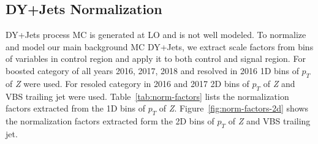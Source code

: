 \subsection{
  DY+Jets Normalization
}

DY+Jets process \gls{MC} is generated at \gls{LO} and is not well modeled.
To normalize and model our main background \gls{MC} DY+Jets,
we extract scale factors from bins of variables
in control region and apply it to both control and signal region.
For boosted category of all years 2016, 2017, 2018
and resolved in 2016 1D bins of \( p_T \) of \textit{Z} were used. For
resoled category in 2016 and 2017 2D bins of \( p_T \) of \textit{Z} and VBS trailing
jet were used. Table~\ref{tab:norm-factors} lists the normalization
factors extracted from the 1D bins of \( p_T \) of \textit{Z}.
Figure~\ref{fig:norm-factors-2d} shows the normalization factors extracted
form the 2D bins of \( p_T \) of \textit{Z} and VBS trailing jet.

